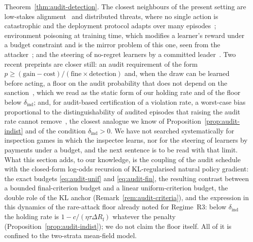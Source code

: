 \begin{remark}
Theorem~\ref{thm:audit-detection}. The closest neighbours of the present setting are low-stakes alignment~\cite{christiano2021lowstakes} and distributed threats, where no single action is catastrophic and the deployment protocol adapts over many episodes~\cite{wen2024}; environment poisoning at training time, which modifies a learner's reward under a budget constraint and is the mirror problem of this one, seen from the attacker~\cite{rakhsha2020poisoning}; and the steering of no-regret learners by a committed leader~\cite{deng2019strategizing}. Two recent preprints are closer still: an audit requirement of the form $p\ge(\text{gain}-\text{cost})/(\text{fine}\times\text{detection})$ and, when the draw can be learned before acting, a floor on the audit probability that does not depend on the sanction~\cite{gans2026randomized}, which we read as the static form of our holding rate and of the floor below $\delta_{\mathrm{ind}}$; and, for audit-based certification of a violation rate, a worst-case bias proportional to the distinguishability of audited episodes that raising the audit rate cannot remove~\cite{zhu2026blindfold}, the closest analogue we know of Proposition~\ref{prop:audit-indist} and of the condition $\delta_{\mathrm{ind}}>0$. We have not searched systematically for inspection games in which the inspectee learns, nor for the steering of learners by payments under a budget, and the next sentence is to be read with that limit. What this section adds, to our knowledge, is
the coupling of the audit schedule with the closed-form log-odds recursion of
KL-regularised natural policy gradient: the exact budgets
\eqref{eq:audit-unif} and \eqref{eq:audit-fin}, the resulting contrast between
a bounded final-criterion budget and a linear uniform-criterion budget, the
double role of the KL anchor (Remark~\ref{rem:audit-criteria}), and the expression in this dynamics of the rare-attack floor already noted for Regime~R3: below $\delta_{\mathrm{ind}}$ the holding rate is $1-c/(\eta\tau\Delta R_{\mathrm f})$ whatever the penalty (Proposition~\ref{prop:audit-indist}); we do not claim the floor itself. All of it is
confined to the two-strata mean-field model.
\end{remark}
